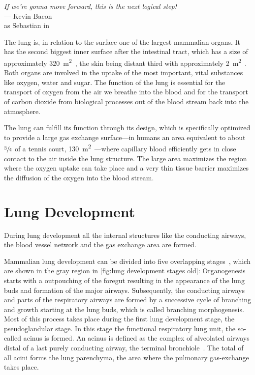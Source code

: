 \acresetall
{}\label{ch:lung}
\begin{flushright}{\slshape If we're gonna move forward, this is the next logical step!} \\ \medskip
	--- Kevin Bacon\\as Sebastian in \citep{HollowMan}
\end{flushright}
\vspace{6cm}

The lung is, in relation to the surface one of the largest mammalian organs. It has the second biggest inner surface after the intestinal tract, which has a size of approximately \SI{320}{\meter\squared}~\cite{Takahashi1999}, the skin being distant third with approximately \SI{2}{\meter\squared}~\cite{Haycock1978}. Both organs are involved in the uptake of the most important, vital substances like oxygen, water and sugar. The function of the lung is essential for the transport of oxygen from the air we breathe into the blood and for the transport of carbon dioxide from biological processes out of the blood stream back into the atmosphere.


The lung can fulfill its function through its design, which is specifically optimized to provide a large gas exchange surface---in humans an area equivalent to about $\sfrac{3}{4}$ of a tennis court, \SI{130}{\meter\squared}~\cite{Weibel2009}---where capillary blood efficiently gets in close contact to the air inside the lung structure. The large area maximizes the region where the oxygen uptake can take place and a very thin tissue barrier maximizes the diffusion of the oxygen into the blood stream.

\section{Lung Development}
During lung development all the internal structures like the conducting airways, the blood vessel network and the gas exchange area are formed. 

Mammalian lung development can be divided into five overlapping stages~\cite{Schittny2004,Schittny2007a}, which are shown in the gray region in \autoref{fig:lung development stages old}: Organogenesis starts with a outpouching of the foregut resulting in the appearance of the lung buds and formation of the major airways. Subsequently, the conducting airways and parts of the respiratory airways are formed by a successive cycle of branching and growth starting at the lung buds, which is called branching morphogenesis. Most of this process takes place during the first lung development stage, the pseudoglandular stage. In this stage the functional respiratory lung unit, the so-called acinus is formed. An acinus is defined as the complex of alveolated airways distal of a last purely conducting airway, the terminal bronchiole~\cite{Rodriguez1987}. The total of all acini forms the lung parenchyma, the area where the pulmonary gas-exchange takes place.

